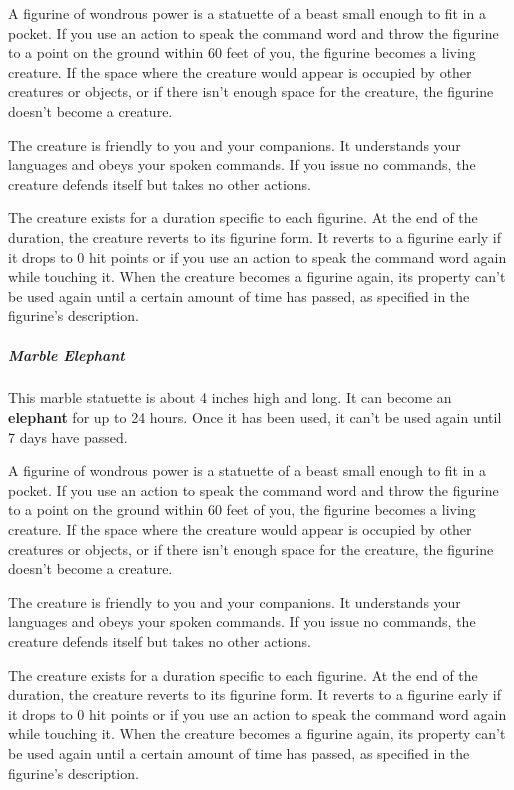 \documentclass[10pt,a4paper,twoside,bg=print,twocolumn,openany,nodeprecatedcode]{dndbook}
\begin{document}
A figurine of wondrous power is a statuette of a beast small enough to fit in a pocket. If you use an action to speak the command word and throw the figurine to a point on the ground within 60 feet of you, the figurine becomes a living creature. If the space where the creature would appear is occupied by other creatures or objects, or if there isn't enough space for the creature, the figurine doesn't become a creature.

The creature is friendly to you and your companions. It understands your languages and obeys your spoken commands. If you issue no commands, the creature defends itself but takes no other actions.

The creature exists for a duration specific to each figurine. At the end of the duration, the creature reverts to its figurine form. It reverts to a figurine early if it drops to 0 hit points or if you use an action to speak the command word again while touching it. When the creature becomes a figurine again, its property can't be used again until a certain amount of time has passed, as specified in the figurine's description.

\subparagraph{Marble Elephant}
This marble statuette is about 4 inches high and long. It can become an \textbf{elephant} for up to 24 hours. Once it has been used, it can't be used again until 7 days have passed.

A figurine of wondrous power is a statuette of a beast small enough to fit in a pocket. If you use an action to speak the command word and throw the figurine to a point on the ground within 60 feet of you, the figurine becomes a living creature. If the space where the creature would appear is occupied by other creatures or objects, or if there isn't enough space for the creature, the figurine doesn't become a creature.

The creature is friendly to you and your companions. It understands your languages and obeys your spoken commands. If you issue no commands, the creature defends itself but takes no other actions.

The creature exists for a duration specific to each figurine. At the end of the duration, the creature reverts to its figurine form. It reverts to a figurine early if it drops to 0 hit points or if you use an action to speak the command word again while touching it. When the creature becomes a figurine again, its property can't be used again until a certain amount of time has passed, as specified in the figurine's description.
\end{document}

